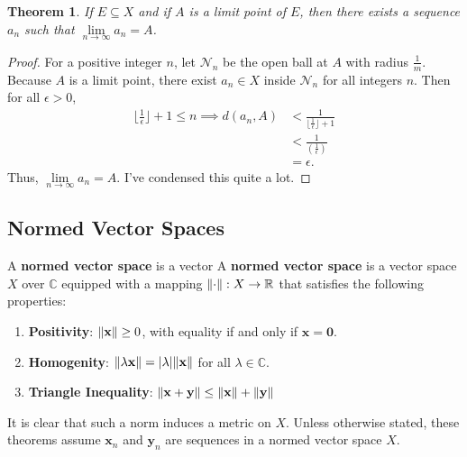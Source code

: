 \documentclass[11pt]{article}
\renewcommand{\vec}[1]{\mathbf{#1}}
\newtheorem{theorem}{Theorem}
\begin{document}
\begin{theorem}
	If $E \subseteq X$ and if $A$ is a limit point of $E$, then there exists a sequence $a_{n}$ such that $\lim\limits_{n \to \infty} a_{n} = A$.
\end{theorem}
\begin{adjustwidth}{0.5cm}{}
	\begin{proof}
		For a positive integer $n$, let $\mathcal{N}_{n}$ be the open ball at $A$ with radius $\tfrac{1}{m}$. Because $A$ is a limit point, there exist $a_{n} \in X$ inside $\mathcal{N}_{n}$ for all integers $n$. Then for all $\epsilon > 0$,
		\begin{align*}
			\lfloor \tfrac{1}{\epsilon} \rfloor + 1 \le n \implies d(a_{n}, A) & < \frac{1}{\lfloor \tfrac{1}{\epsilon} \rfloor + 1} \\
			                                                                   & < \frac{1}{\left( \tfrac{1}{\epsilon} \right)}      \\
			                                                                   & = \epsilon.
		\end{align*}
		Thus, $\lim\limits_{n \to \infty} a_{n} = A$. I've condensed this quite a lot.
	\end{proof}
\end{adjustwidth}


\subsection{Normed Vector Spaces}

A \textbf{normed vector space} is a vector A \textbf{normed vector space} is a vector space $X$ over $\mathbb{C}$ equipped with a mapping $\norm{\cdot} : X \to \mathbb{R}$ that satisfies the following properties:
\begin{enumerate}
	\item \textbf{Positivity}: $\norm{\vec{x}} \ge 0$, with equality if and only if $\vec{x} = \vec{0}$.
	\item \textbf{Homogenity}: $\norm{\lambda \vec{x}} = \abs{\lambda} \norm{\vec{x}}$ for all $\lambda \in \mathbb{C}$.
  \item \textbf{Triangle Inequality}: $\norm{\vec{x} + \vec{y}} \le \norm{\vec{x}} + \norm{\vec{y}}$
\end{enumerate}
It is clear that such a norm induces a metric on $X$. Unless otherwise stated, these theorems assume $\vec{x}_{n}$ and $\vec{y}_{n}$ are sequences in a normed vector space $X$.
\end{document}
